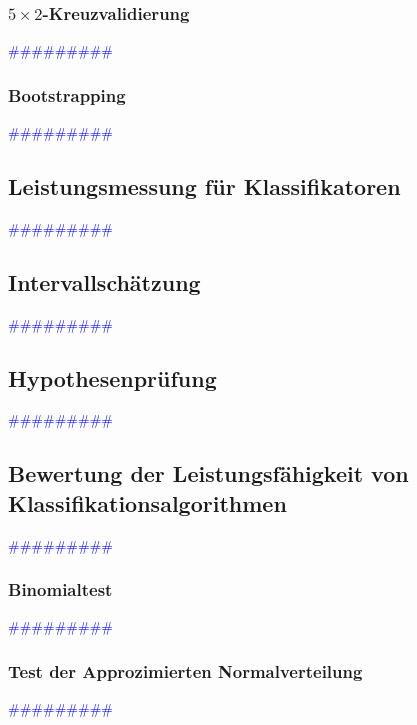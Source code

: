 \documentclass{article}
\begin{document}
    \subsubsection{$5 \times 2$-Kreuzvalidierung} %
       \textcolor{blue}{\#\#\#\#\#\#\#\#\#}
    \subsubsection{Bootstrapping} %
       \textcolor{blue}{\#\#\#\#\#\#\#\#\#}
  \subsection{Leistungsmessung für Klassifikatoren} %
       \textcolor{blue}{\#\#\#\#\#\#\#\#\#}
  \subsection{Intervallschätzung} %
       \textcolor{blue}{\#\#\#\#\#\#\#\#\#}
  \subsection{Hypothesenprüfung} %
       \textcolor{blue}{\#\#\#\#\#\#\#\#\#}
  \subsection{Bewertung der Leistungsfähigkeit von Klassifikationsalgorithmen} %
       \textcolor{blue}{\#\#\#\#\#\#\#\#\#}
    \subsubsection{Binomialtest} %
       \textcolor{blue}{\#\#\#\#\#\#\#\#\#}
    \subsubsection{Test der Approzimierten Normalverteilung} %
       \textcolor{blue}{\#\#\#\#\#\#\#\#\#}
\end{document}
